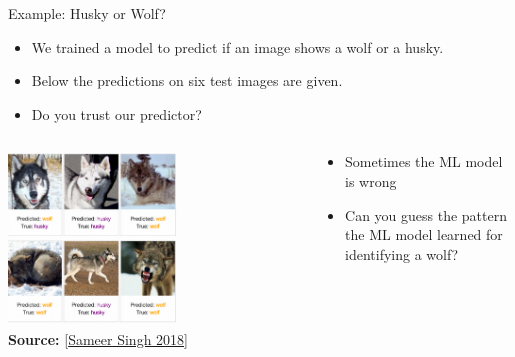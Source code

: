 \documentclass[11pt,compress,t,notes=noshow, aspectratio=169, xcolor=table]{beamer}
\begin{document}
\begin{vbframe}[c]{Example: Husky or Wolf?}
	\begin{itemize}
		\item We trained a model to predict if an image shows a wolf or a husky. 
		\item Below the predictions on six test images are given. 
		\item Do you trust our predictor? 
	\end{itemize}
	
	\begin{columns}
	
	\begin{column}{0.6\textwidth}
	    
    	\begin{center}
    		\includegraphics[width=0.58\textwidth]{figure/lime-wolfhusky.png}\\
    		\includegraphics[width=0.58\textwidth]{figure/lime-wolfhusky2.png}\\
    		{\textbf{Source:} [\href{http://www.facweb.iitkgp.ac.in/~niloy/COURSE/Spring2018/IntelligentSystem/PPT_2018/why_should_i_trust_ppt.pdf}{Sameer Singh 2018}]}
    	\end{center}
	    
	\end{column}
	
	\begin{column}{0.4\textwidth}
	    
	\begin{itemize}
		\item Sometimes the ML model is wrong
		\item Can you guess the pattern the ML model learned for identifying a wolf?
	\end{itemize}
	    
	\end{column}
	    
	\end{columns}

\end{vbframe}
\end{document}
